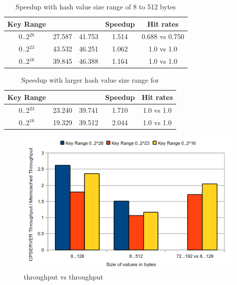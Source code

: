 \begin{table}[!ht]
\centering
\begin{tabular}{ | c | c | c | c | c | }
  \hline
  Key Range & \cpserver{} & \memcached{} & Speedup & Hit rates \\
  \hline
  0..2$^{28}$ & 27.587 & 41.753 & 1.514 & 0.688 vs 0.750 \\
  0..2$^{23}$ & 43.532 & 46.251 & 1.062 & 1.0 vs 1.0     \\
  0..2$^{16}$ & 39.845 & 46.388 & 1.164 & 1.0 vs 1.0     \\
  \hline
\end{tabular}
\caption{Speedup with hash value size range of 8 to 512 bytes} 
\label{table:memcachedspeedup1}
\end{table}

\begin{table}[!ht]
\centering
\begin{tabular}{ | c | c | c | c | c | }
  \hline
  Key Range & \cpserver{} & \memcached{} & Speedup & Hit rates \\
  \hline
  0..2$^{23}$ & 23.240 & 39.741 & 1.710 & 1.0 vs 1.0   \\
  0..2$^{16}$ & 19.329 & 39.512 & 2.044 & 1.0 vs 1.0   \\
  \hline
\end{tabular}
\caption{Speedup with larger hash value size range for \cpserver{}} 
\label{table:memcachedspeedup2}
\end{table}

\begin{figure}[!ht]
  \centering
  \includegraphics[width=\linewidth]{figs/cpserverspeedup2.png}
  \caption{\cpserver{} throughput vs \memcached{} throughput}
  \label{fig:cpserverspeedup2}
\end{figure}


